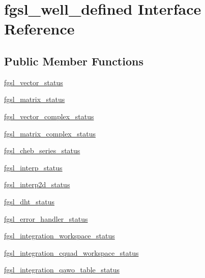 \hypertarget{interfacefgsl__well__defined}{}\section{fgsl\+\_\+well\+\_\+defined Interface Reference}
\label{interfacefgsl__well__defined}
\subsection*{Public Member Functions}
\begin{DoxyCompactItemize}
\item 
\hyperlink{interfacefgsl__well__defined_a33e0c65aa79c88ad81052e764091bc27}{fgsl\+\_\+vector\+\_\+status}
\item 
\hyperlink{interfacefgsl__well__defined_a07331a0d9cb8799a4e32602c2dd4c50d}{fgsl\+\_\+matrix\+\_\+status}
\item 
\hyperlink{interfacefgsl__well__defined_a9ba185d2dadb44bf1f2d405fa3db0738}{fgsl\+\_\+vector\+\_\+complex\+\_\+status}
\item 
\hyperlink{interfacefgsl__well__defined_af1397e3ea23d92c940730db99bbd82f7}{fgsl\+\_\+matrix\+\_\+complex\+\_\+status}
\item 
\hyperlink{interfacefgsl__well__defined_a31c950085c0b207f97e87f5a929330fe}{fgsl\+\_\+cheb\+\_\+series\+\_\+status}
\item 
\hyperlink{interfacefgsl__well__defined_a73f7ca7b279395bf73fdfe024d2fcae9}{fgsl\+\_\+interp\+\_\+status}
\item 
\hyperlink{interfacefgsl__well__defined_aa37e518d060262e6268250484d4c7c0c}{fgsl\+\_\+interp2d\+\_\+status}
\item 
\hyperlink{interfacefgsl__well__defined_a63cea1503bb0b2a08e8fbb4bdc4dadc5}{fgsl\+\_\+dht\+\_\+status}
\item 
\hyperlink{interfacefgsl__well__defined_a7c228dd633ee2c67f6a054d29eae41ff}{fgsl\+\_\+error\+\_\+handler\+\_\+status}
\item 
\hyperlink{interfacefgsl__well__defined_a5ea29ed879fe64d5bf15de25dcac8d8d}{fgsl\+\_\+integration\+\_\+workspace\+\_\+status}
\item 
\hyperlink{interfacefgsl__well__defined_acf0bb8ed00359821932d9ef64859dfb0}{fgsl\+\_\+integration\+\_\+cquad\+\_\+workspace\+\_\+status}
\item 
\hyperlink{interfacefgsl__well__defined_adc3349fd6c0f0a2ac03c2189126b97d3}{fgsl\+\_\+integration\+\_\+qawo\+\_\+table\+\_\+status}
\item 

\end{DoxyCompactItemize}
